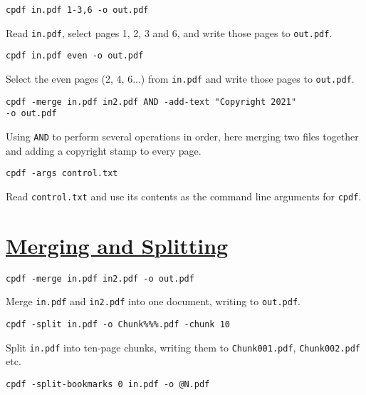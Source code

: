 \documentclass{book}
\begin{document}
\begin{framed}\noindent\texttt{cpdf in.pdf 1-3,6 -o out.pdf}\end{framed}

\noindent Read \texttt{in.pdf}, select pages 1, 2, 3 and 6, and write those pages to \texttt{out.pdf}.


\begin{framed}\noindent\texttt{cpdf in.pdf even -o out.pdf}\end{framed}
                  
\noindent Select the even pages (2, 4, 6...) from \texttt{in.pdf} and write those pages to \texttt{out.pdf}.

\begin{framed}\noindent\texttt{cpdf -merge in.pdf in2.pdf AND -add-text "Copyright 2021"\\\phantom{\ \ \ \ } -o out.pdf}\end{framed}

\noindent Using \texttt{AND} to perform several operations in order, here merging two files together and adding a copyright stamp to every page.

\begin{framed}\noindent\texttt{cpdf -args control.txt}\end{framed}

\noindent Read \texttt{control.txt} and use its contents as the command line arguments for \texttt{cpdf}.

\section*{\hyperref[chap:2]{Merging and Splitting}}

\begin{framed}\noindent\texttt{cpdf -merge in.pdf in2.pdf -o out.pdf}\end{framed}

\noindent Merge \texttt{in.pdf} and \texttt{in2.pdf} into one document, writing to \texttt{out.pdf}.

\begin{framed}\noindent\texttt{cpdf -split in.pdf -o Chunk\%\%\%.pdf -chunk 10}\end{framed}

\noindent Split \texttt{in.pdf} into ten-page chunks, writing them to \texttt{Chunk001.pdf}, \texttt{Chunk002.pdf} etc.

\begin{framed}\noindent\texttt{cpdf -split-bookmarks 0 in.pdf -o @N.pdf}\end{framed}
\end{document}
